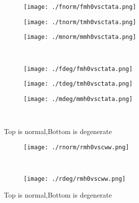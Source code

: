 \documentclass[aps,floats,floatfix,nofootinbib]{revtex4-1}
\begin{document}
\begin{center}
\begin{figure}
\begin{subfigure}{0.3\textwidth}
\texttt{[image: ./fnorm/fmh0vsctata.png]}
\label{}
\end{subfigure}
\begin{subfigure}{0.3\textwidth}
\texttt{[image: ./tnorm/tmh0vsctata.png]}
\label{}
\end{subfigure}
\begin{subfigure}{0.3\textwidth}
\texttt{[image: ./mnorm/mmh0vsctata.png]}
\label{}
\end{subfigure}\\
\begin{subfigure}{0.3\textwidth}
\texttt{[image: ./fdeg/fmh0vsctata.png]}
\label{}
\end{subfigure}
\begin{subfigure}{0.3\textwidth}
\texttt{[image: ./tdeg/tmh0vsctata.png]}
\label{}
\end{subfigure}
\begin{subfigure}{0.3\textwidth}
\texttt{[image: ./mdeg/mmh0vsctata.png]}
\label{}
\end{subfigure}\\
\caption{Top is normal,Bottom is degenerate}
\end{figure}
\end{center}

\begin{center}
\begin{figure}
\begin{subfigure}{0.95\textwidth}
\texttt{[image: ./rnorm/rmh0vscww.png]}
\label{}
\end{subfigure}\\
\begin{subfigure}{0.95\textwidth}
\texttt{[image: ./rdeg/rmh0vscww.png]}
\label{}
\end{subfigure}
\caption{Top is normal,Bottom is degenerate}
\end{figure}
\end{center}
\end{document}

